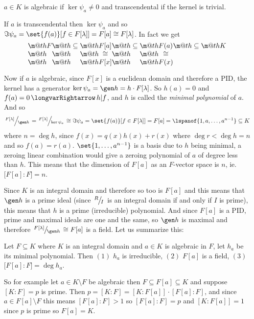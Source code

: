 \bdefn

    $a\in K$ is {\emphcolor algebraic} if $\ker\psi_a\neq0$ and {\emphcolor transcendental} if the kernel is trivial.

\edefn

If $a$ is transcendental then $\ker\psi_a$ and so $\Im\psi_a=\set{f(a)}[{f\in F[\lambda]}]=F[a]\cong F[\lambda]$.
In fact we get
$$ \vcenter{\ialign{&${}\m@th#{}$\cr
    F &\subseteq& F[a] &\subseteq& F(a) &\subseteq& K\cr 
      &         & \cong &        & \cong\cr
      &         & F[x]  &        & F(x)\cr
    }}
$$

Now if $a$ is algebraic, since $F[x]$ is a euclidean domain and therefore a PID, the kernel has a generator $\ker\psi_a=\gen h=h\cdot F[\lambda]$.
So $h(a)=0$ and $f(a)=0\implies h\divides f$, and $h$ is called the {\it minimal polynomial} of $a$.
And so
$$ \slfrac{F[\lambda]}{\gen h} = \slfrac{F[\lambda]}{\ker\psi_a} \cong \Im\psi_a = \set{f(a)}[{f\in F[\lambda]}] = F[a] = \lspanof{1,a,\dots,a^{n-1}} \subseteq K $$
where $n=\deg h$, since $f(x)=q(x)h(x)+r(x)$ where $\deg r<\deg h=n$ and so $f(a)=r(a)$.
$\set{1,\dots,a^{n-1}}$ is a basis due to $h$ being minimal, a zeroing linear combination would give a zeroing polynomial of $a$ of degree less than $h$.
This means that the dimension of $F[a]$ as an $F$-vector space is $n$, ie. $\bigl[F[a]:F\bigr]=n$.

Since $K$ is an integral domain and therefore so too is $F[a]$ and this means that $\gen h$ is a prime ideal (since $\slfrac RI$ is an integral domain if and only if $I$ is prime), this means
that $h$ is a prime (irreducible) polynomial.
And since $F[a]$ is a PID, prime and maximal ideals are one and the same, so $\gen h$ is maximal and therefore $\slfrac{F[\lambda]}{\gen h}\cong F[a]$ is a field.
Let us summarize this:

\bprop

    Let $F\subseteq K$ where $K$ is an integral domain and $a\in K$ is algebraic in $F$, let $h_a$ be its minimal polynomial.
    Then $(1)$ $h_a$ is irreducible, $(2)$ $F[a]$ is a field, $(3)$ $\bigl[F[a]:F\bigr]=\deg h_a$.

\eprop

So for example let $a\in K\setminus F$ be algebraic then $F\subseteq F[a]\subseteq K$ and suppose $[K:F]=p$ is prime.
Then $p=[K:F]=[K:F[a]]\cdot[F[a]:F]$, and since $a\in F[a]\setminus F$ this means $[F[a]:F]>1$ so $[F[a]:F]=p$ and $[K:F[a]]=1$ since $p$ is prime so $F[a]=K$.

\bcoro

